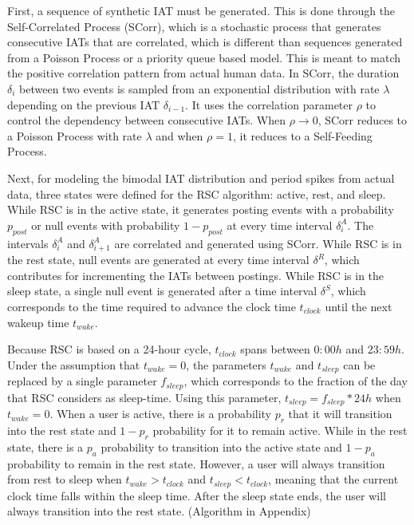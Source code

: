 \documentclass[11pt, oneside]{article}   	%
\begin{document}
\quad First, a sequence of synthetic IAT must be generated.
This is done through the Self-Correlated Process (SCorr), which is a stochastic process that generates consecutive IATs that are correlated, which is different than sequences generated from a Poisson Process or a priority queue based model.
This is meant to match the positive correlation pattern from actual human data.
In SCorr, the duration $\delta_i$ between two events is sampled from an exponential distribution with rate $\lambda$ depending on the previous IAT $\delta_{i-1}$. It uses the correlation parameter $\rho$ to control the dependency between consecutive IATs. When $\rho \rightarrow 0$, SCorr reduces to a Poisson Process with rate $\lambda$ and when $\rho = 1$, it reduces to a Self-Feeding Process.

\quad Next, for modeling the bimodal IAT distribution and period spikes from actual data, three states were defined for the RSC algorithm: active, rest, and sleep.
While RSC is in the active state, it generates posting events with a probability $p_{post}$ or null events with probability $1-p_{post}$ at every time interval $\delta_i^A$.
The intervals $\delta_i^A$ and $\delta_{i+1}^A$ are correlated and generated using SCorr.
While RSC is in the rest state, null events are generated at every time interval $\delta^R$, which contributes for incrementing the IATs between postings.
While RSC is in the sleep state, a single null event is generated after a time interval $\delta^S$, which corresponds to the time required to advance the clock time $t_{clock}$ until the next wakeup time $t_{wake}$.

\quad Because RSC is based on a 24-hour cycle, $t_{clock}$ spans between $0:00h$ and $23:59h$.
Under the assumption that $t_{wake}=0$, the parameters $t_{wake}$ and $t_{sleep}$ can be replaced by a single parameter $f_{sleep}$, which corresponds to the fraction of the day that RSC considers as sleep-time.
Using this parameter, $t_{sleep}=f_{sleep}*24h$ when $t_{wake}=0$.
When a user is active, there is a probability $p_r$ that it will transition into the rest state and $1-p_r$ probability for it to remain active.
While in the rest state, there is a $p_a$ probability to transition into the active state and $1-p_a$ probability to remain in the rest state.
However, a user will always transition from rest to sleep when $t_{wake} > t_{clock}$ and $t_{sleep} < t_{clock}$, meaning that the current clock time falls within the sleep time.
After the sleep state ends, the user will always transition into the rest state. (Algorithm in Appendix)
\end{document}
